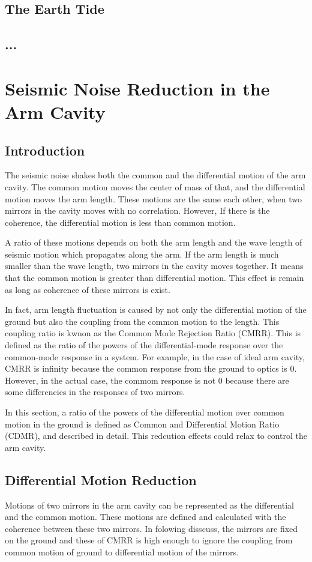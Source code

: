 \documentclass[a4paper,12pt]{book}
\begin{document}
\subsection{The Earth Tide}
\subsection{...}
\section{Seismic Noise Reduction in the Arm Cavity}
\subsection{Introduction}
The seismic noise shakes both the common and the differential motion of the arm cavity. The common motion moves the center of mass of that, and the differential motion moves the arm length. These motions are the same each other, when two mirrors in the cavity moves with no correlation. However, If there is the coherence, the differential motion is less than common motion. 

A ratio of these motions depends on both the arm length and the wave length of seismic motion which propagates along the arm. If the arm length is much smaller than the wave length, two mirrors in the cavity moves together. It means that the common motion is greater than differential motion. This effect is remain as long as coherence of these mirrors is exist.

In fact, arm length fluctuation is caused by not only the differential motion of the ground but also the coupling from the common motion to the length. This coupling ratio is kwnon as the Common Mode Rejection Ratio (CMRR). This is defined as the ratio of the powers of the differential-mode response over the common-mode response in a system. For example, in the case of ideal arm cavity, CMRR is infinity because the common response from the ground to optics is 0. However, in the actual case, the commom response is not 0 because there are some differencies in the responses of two mirrors. 

In this section, a ratio of the powers of the differential motion over common motion in the ground is defined as Common and Differential Motion Ratio (CDMR), and described in detail. This redcution effects could relax to control the arm cavity. 


\subsection{Differential Motion Reduction}
Motions of two mirrors in the arm cavity can be represented as the differential and the common motion. These motions are defined and calculated with the coherence between these two mirrors. In folowing disscuss, the mirrors are fixed on the ground and these of CMRR is high enough to ignore the coupling from common motion of ground to differential motion of the mirrors.
\end{document}

